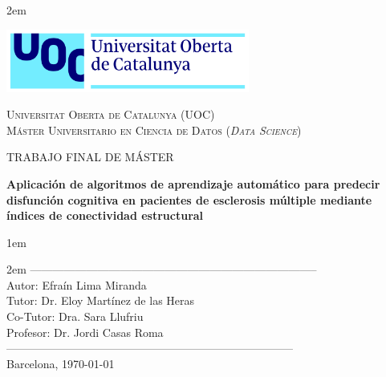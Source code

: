 \newpage
\thispagestyle{empty}

\baselineskip 2em


\centerline {\includegraphics[width=0.6\textwidth]{figs/UOC-logo}}
\begin{center}
\textsc{Universitat Oberta de Catalunya (UOC) \\
 Máster Universitario en Ciencia de Datos (\textit{Data Science})\\}


\vspace*{1.5cm}

\textsc{\Large TRABAJO FINAL DE MÁSTER}



\vspace*{1.5cm}

\textbf{\Large Aplicación de algoritmos de aprendizaje automático para predecir disfunción cognitiva en pacientes de esclerosis múltiple mediante índices de conectividad estructural}


\vspace{2.5cm}
\baselineskip 1em

\vspace{1cm}
\baselineskip 2em
-----------------------------------------------------------------------------\\
Autor:      Efraín Lima Miranda\\
Tutor:   Dr. Eloy Martínez de las Heras\\
Co-Tutor:   Dra. Sara Llufriu\\
Profesor: Dr. Jordi Casas Roma\\

-----------------------------------------------------------------------------\\
\vspace*{1.5cm}
Barcelona, \today

\end{center}

